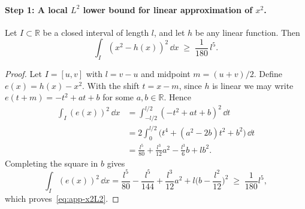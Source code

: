 \documentclass[11pt]{article}
\begin{document}

\paragraph{Step 1: A local $L^2$ lower bound for linear approximation of $x^2$.}
\begin{lemma}
\label{lemma:diam}
Let $I\subset\mathbb{R}$ be a closed interval of length $l$, and let $h$ be any linear function. Then
\begin{equation}
\int_I (x^2-h(x))^2\,\dd x \;\ge\; \frac{1}{180}\,l^5.
\label{eq:app-x2L2}
\end{equation}
\end{lemma}

\begin{proof}
Let $I=[u,v]$ with $l=v-u$ and midpoint $m=(u+v)/2$. Define $e(x)=h(x)-x^2$. With the shift
$t=x-m$, since $h$ is linear we may write $e(t+m)=-t^2+at+b$ for some $a,b\in\mathbb{R}$. Hence
\begin{align*}
\int_I (e(x))^2\,\dd x
&=\int_{-l/2}^{l/2}(-t^2+at+b)^2\,\dd t \\
&=2\int_{0}^{l/2}\Big(t^4+(a^2-2b)t^2+b^2\Big)\,\dd t \\
&=\frac{l^5}{80}+\frac{l^3}{12}a^2-\frac{l^3}{6}b+lb^2.
\end{align*}
Completing the square in $b$ gives
\[
\int_I (e(x))^2\,\dd x
=\frac{l^5}{80}-\frac{l^5}{144}+\frac{l^3}{12}a^2
+l\Big(b-\frac{l^2}{12}\Big)^2
\;\ge\;\frac{1}{180}l^5,
\]
which proves~\eqref{eq:app-x2L2}.
\end{proof}
\end{document}
